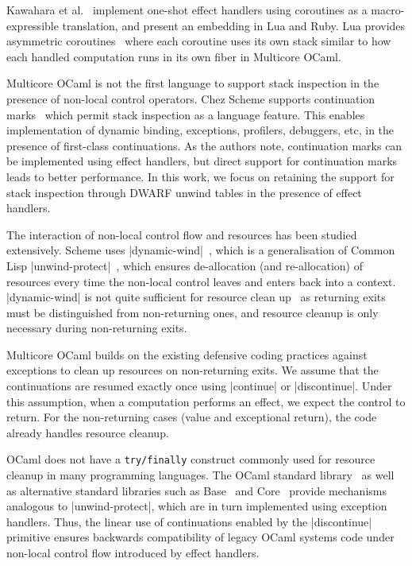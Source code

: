 \documentclass[sigplan,screen]{acmart}
\begin{document}
Kawahara et al.~\cite{Kawahara20} implement one-shot effect handlers using
coroutines as a macro-expressible translation, and present an embedding in Lua
and Ruby. Lua provides asymmetric coroutines~\cite{Lua} where each coroutine
uses its own stack similar to how each handled computation runs in its own
fiber in Multicore OCaml.

Multicore OCaml is not the first language to support stack inspection in the
presence of non-local control operators. Chez Scheme supports continuation
marks~\cite{Flatt20} which permit stack inspection as a language feature. This
enables implementation of dynamic binding, exceptions, profilers, debuggers,
etc, in the presence of first-class continuations. As the authors note,
continuation marks can be implemented using effect handlers, but direct support
for continuation marks leads to better performance. In this work, we focus on
retaining the support for stack inspection through DWARF unwind tables in the
presence of effect handlers.

The interaction of non-local control flow and resources has been studied
extensively. Scheme uses |dynamic-wind|~\cite{R5RS}, which is a generalisation
of Common Lisp |unwind-protect|~\cite{Steele90}, which ensures de-allocation
(and re-allocation) of resources every time the non-local control leaves and
enters back into a context. |dynamic-wind| is not quite sufficient for resource
clean up~\cite{Kiselyov,Sitaram03} as returning exits must be distinguished
from non-returning ones, and resource cleanup is only necessary during
non-returning exits.

Multicore OCaml builds on the existing defensive coding practices against
exceptions to clean up resources on non-returning exits. We assume that the
continuations are resumed exactly once using |continue| or |discontinue|. Under
this assumption, when a computation performs an effect, we expect the control
to return. For the non-returning cases (value and exceptional return), the code
already handles resource cleanup.

OCaml does not have a \texttt{\footnotesize try/finally} construct commonly
used for resource cleanup in many programming languages. The OCaml standard
library~\cite{FunProtect} as well as alternative standard libraries such as
Base~\cite{BaseProtect} and Core~\cite{CoreProtect} provide mechanisms
analogous to |unwind-protect|, which are in turn implemented using exception
handlers. Thus, the linear use of continuations enabled by the |discontinue|
primitive ensures backwards compatibility of legacy OCaml systems code under
non-local control flow introduced by effect handlers.
\end{document}
